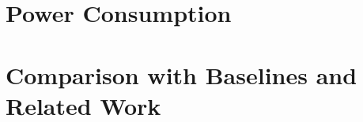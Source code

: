 \section{Power Consumption}
\label{sec:power}

\section{Comparison with Baselines and Related Work}
\label{sec:comparison}

